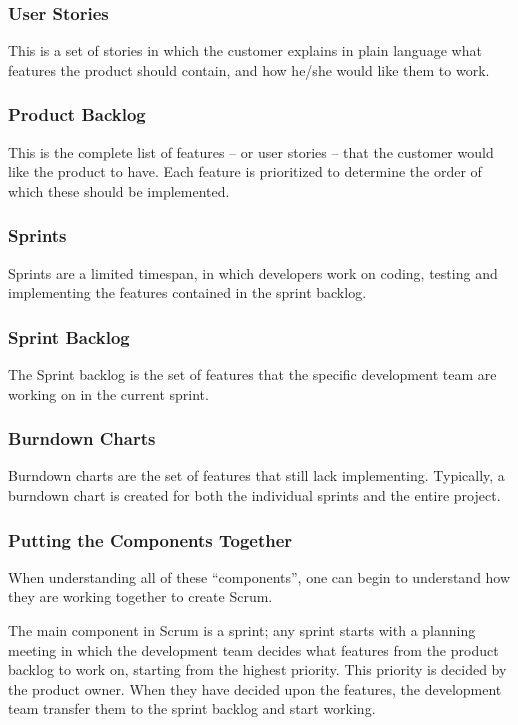 \subsubsection{User Stories}
This is a set of stories in which the customer explains in plain language what features the product should contain, and how he/she would like them to work.

\subsubsection{Product Backlog}
This is the complete list of features -- or user stories -- that the customer would like the product to have.
Each feature is prioritized to determine the order of which these should be implemented.

\subsubsection{Sprints}
Sprints are a limited timespan, in which developers work on coding, testing and implementing the features contained in the sprint backlog.

\subsubsection{Sprint Backlog}
The Sprint backlog is the set of features that the specific development team are working on in the current sprint.

\subsubsection{Burndown Charts}
Burndown charts are the set of features that still lack implementing. Typically, a burndown chart is created for both the individual sprints and the entire project.

\subsubsection{Putting the Components Together}
When understanding all of these ``components'', one can begin to understand how they are working together to create Scrum.

The main component in Scrum is a sprint;
any sprint starts with a planning meeting in which the development team decides what features from the product backlog to work on, starting from the highest priority. This priority is decided by the product owner. When they have decided upon the features, the development team transfer them to the sprint backlog and start working.

